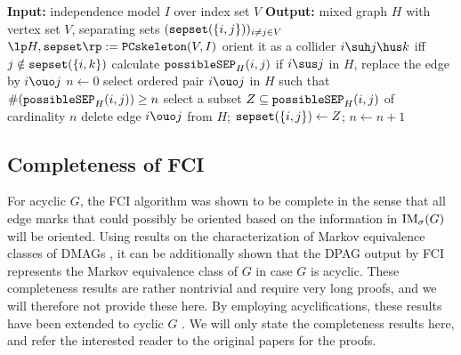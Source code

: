 \begin{algorithm}
  \begin{algorithmic}
  \State \textbf{Input:} independence model $I$ over index set $V$
  \State \textbf{Output:} mixed graph $H$ with vertex set $V$, separating sets $(\mathtt{sepset}(\{i,j\}))_{i\ne j \in V}$
  \State $\lt H,\sepset \rt := \mathtt{PCskeleton}(V,I)$
    \State orient it as a collider $i \suh j \hus k$ iff $j \notin \mathtt{sepset}(\{i,k\})$
  \EndFor
    \State calculate $\mathtt{possibleSEP}_H(i,j)$
  \EndFor
    \State if $i \sus j$ in $H$, replace the edge by $i \ouo j$
  \EndFor
  \State $n \leftarrow 0$
    \Repeat
    \Repeat
    \State select ordered pair $i \ouo j$ in $H$ such that $\#(\mathtt{possibleSEP}_H(i,j)) \ge n$
    \State select a subset $Z \subseteq \mathtt{possibleSEP}_H(i,j)$ of cardinality $n$
      \State delete edge $i \ouo j$ from $H$;
      \State $\mathtt{sepset}(\{i,j\}) \leftarrow Z$;
    \EndIf
    \State $n \leftarrow n + 1$
  \end{algorithmic}
  \caption{FCI skeleton algorithm $\mathtt{FCIskeleton}(V,I)$.\label{alg:fci_skeleton}}
\end{algorithm}


\subsection{Completeness of FCI}

For acyclic $G$, the FCI algorithm was shown to be complete \cite{Zhang2008_AI} in the sense that all edge marks that could possibly be oriented based on the information in $\mathrm{IM}_\sigma(G)$ will be oriented.
Using results on the characterization of Markov equivalence classes of DMAGs \cite{Ali++2005}, it can be additionally shown that the DPAG output by FCI represents the Markov equivalence class of $G$ in case $G$ is acyclic.
These completeness results are rather nontrivial and require very long proofs, and we will therefore not provide these here.
By employing acyclifications, these results have been extended to cyclic $G$ \cite{MooijClaassen_UAI_20}.
We will only state the completeness results here, and refer the interested reader to the original papers for the proofs.

